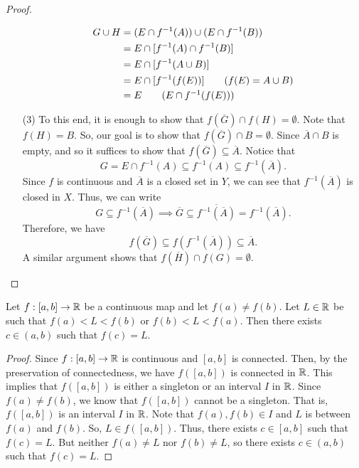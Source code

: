 \documentclass[a4paper]{article}
\begin{document}
\begin{proof}
\begin{enumerate}
        \begin{align*}
            G \cup H &= (E \cap f^{-1}(A)) \cup (E \cap f^{-1}(B)) \\
                     &= E \cap [f^{-1}(A) \cap f^{-1}(B)] \\
                     &= E \cap [f^{-1}(A \cup B)] \\
                     &= E \cap [f^{-1}(f(E))] \tag{\( f(E) = A \cup B \)} \\
                     &= E \tag{\( E \cap f^{-1}(f(E)) \)} 
        \end{align*}
    \item[(3)] To this end, it is enough to show that \( f(\overline{G}) \cap f(H) = \emptyset  \). Note that \( f(H) = B \). So, our goal is to show that \( f(\overline{G}) \cap B = \emptyset  \). Since \( \overline{A} \cap  B \) is empty, and so it suffices to show that \( f(\overline{G}) \subseteq \overline{A} \). Notice that 
        \[  G = E \cap f^{-1}(A) \subseteq f^{-1}(A) \subseteq f^{-1}(\overline{A}).  \]
        Since \( f  \) is continuous and \( \overline{A}  \) is a closed set in \( Y  \), we can see that \( f^{-1}(\overline{A}) \) is closed in \( X  \). Thus, we can write
        \[  G \subseteq f^{-1}(\overline{A}) \implies \overline{G} \subseteq \overline{f^{-1}(\overline{A})} = f^{-1}(\overline{A}). \]
        Therefore, we have 
        \[  f(\overline{G}) \subseteq f(f^{-1}(\overline{A})) \subseteq \overline{A}. \]
    A similar argument shows that \( f(\overline{H}) \cap f(G) = \emptyset \).
\end{enumerate}
\end{proof}

\begin{theorem}
    Let \( f: [a,b] \to \mathbb{R}  \) be a continuous map and let \( f(a) \neq f(b)  \). Let \( L \in \mathbb{R}  \) be such that \( f(a) < L < f(b) \) or \( f(b) < L < f(a) \). Then there exists \( c \in (a,b) \) such that \( f(c) = L  \).
\end{theorem}
\begin{proof}
    Since \( f:[a,b] \to \mathbb{R}  \) is continuous and \( [a,b]  \) is connected. Then, by the preservation of connectedness, we have \( f([a,b]) \) is connected in \( \mathbb{R}   \). This implies that \( f([a,b]) \) is either a singleton or an interval \( I  \) in \( \mathbb{R}  \). Since \( f(a) \neq f(b) \), we know that \( f([a,b]) \) cannot be a singleton. That is, \( f([a,b]) \) is an interval \( I  \) in \( \mathbb{R}  \). Note that \( f(a), f(b) \in I \) and \( L  \) is between \( f(a)  \) and \( f(b) \). So, \( L \in f([a,b]) \). Thus, there exists \( c \in [a,b] \) such that \( f(c) = L  \). But neither \( f(a) \neq L  \) nor \( f(b) \neq L  \), so there exists \( c \in (a,b) \) such that \( f(c) = L  \).
\end{proof}
\end{document}
